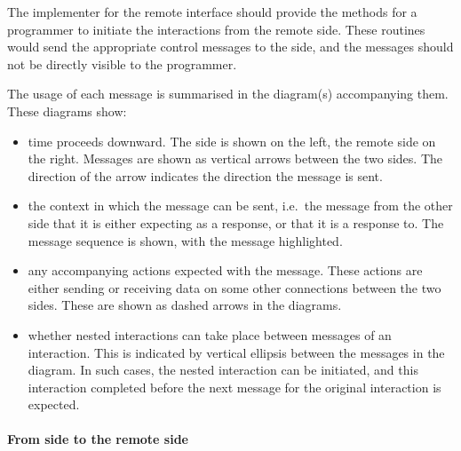 The implementer for the remote interface should provide the methods for a
programmer to initiate the interactions from the remote side. These
routines would send the appropriate control messages to the {\eclipse}
side, and the messages should not be directly visible to the programmer. 

The usage of each message is summarised in the diagram(s) accompanying
them. These diagrams show:

\begin{itemize}
\item time proceeds downward. The {\eclipse} side is shown on the left,
the remote side on the right. Messages are shown as vertical arrows between
the two sides. The direction of the arrow indicates the direction the
message is sent.

\item the context in which the message can be sent, i.e.\ the message from
the other side that it is either expecting as a response, or that it is a
response to. The message sequence is shown, with the message highlighted.

\item any accompanying actions expected with the message. These actions are
either sending or receiving data on some other connections between the two
sides. These are shown as dashed arrows in the diagrams.

\item whether nested interactions can take place between messages of an interaction.
This is indicated by vertical ellipsis between the messages in
the diagram. In such cases, the nested interaction can be initiated, and this
interaction completed before the next message for the original interaction
is expected.
\end{itemize}

\paragraph{From {\eclipse} side to the remote side}

